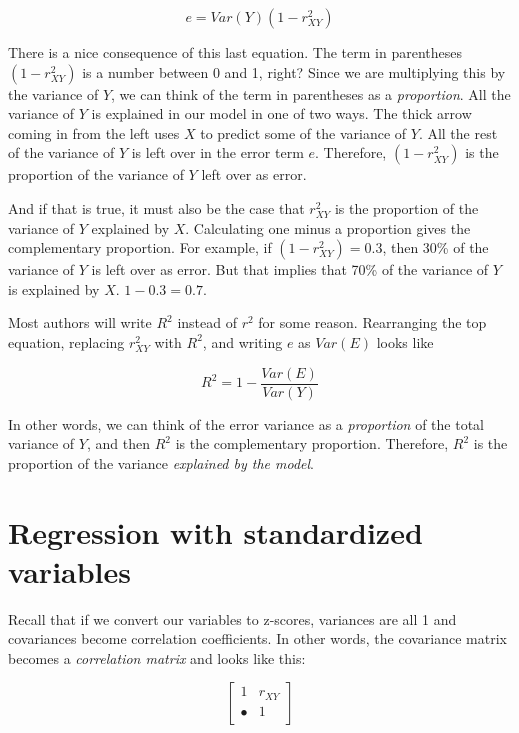 \documentclass[
]{book}
\begin{document}
\[
e = Var(Y) \left( 1 - r_{XY}^2 \right)
\]

There is a nice consequence of this last equation. The term in parentheses \(\left( 1 - r_{XY}^2 \right)\) is a number between 0 and 1, right? Since we are multiplying this by the variance of \(Y\), we can think of the term in parentheses as a \emph{proportion}. All the variance of \(Y\) is explained in our model in one of two ways. The thick arrow coming in from the left uses \(X\) to predict some of the variance of \(Y\). All the rest of the variance of \(Y\) is left over in the error term \(e\). Therefore, \(\left( 1 - r_{XY}^2 \right)\) is the proportion of the variance of \(Y\) left over as error.

And if that is true, it must also be the case that \(r_{XY}^2\) is the proportion of the variance of \(Y\) explained by \(X\). Calculating one minus a proportion gives the complementary proportion. For example, if \(\left( 1 - r_{XY}^2 \right) = 0.3\), then 30\% of the variance of \(Y\) is left over as error. But that implies that 70\% of the variance of \(Y\) is explained by \(X\). \(1 - 0.3 = 0.7\).

Most authors will write \(R^{2}\) instead of \(r^{2}\) for some reason. Rearranging the top equation, replacing \(r_{XY}^{2}\) with \(R^{2}\), and writing \(e\) as \(Var(E)\) looks like

\[
R^{2} = 1 - \frac{Var(E)}{Var(Y)}
\]

In other words, we can think of the error variance as a \emph{proportion} of the total variance of \(Y\), and then \(R^2\) is the complementary proportion. Therefore, \(R^{2}\) is the proportion of the variance \emph{explained by the model}.

\hypertarget{simple-standardized}{%
\section{Regression with standardized variables}\label{simple-standardized}}

Recall that if we convert our variables to z-scores, variances are all 1 and covariances become correlation coefficients. In other words, the covariance matrix becomes a \emph{correlation matrix} and looks like this:

\[
\begin{bmatrix}
1       &    r_{XY} \\
\bullet &    1      \\
\end{bmatrix}
\]
\end{document}
